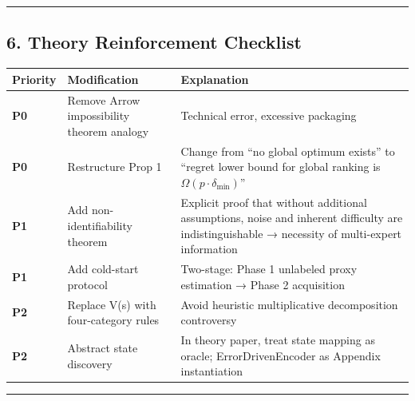 \documentclass[
  12pt,
]{article}
\begin{document}
\begin{center}\rule{0.5\linewidth}{0.5pt}\end{center}

\subsection{6. Theory Reinforcement Checklist}\label{theory-reinforcement-checklist}

\begin{longtable}[]{@{}
  >{\raggedright\arraybackslash}p{}
  >{\raggedright\arraybackslash}p{}
  >{\raggedright\arraybackslash}p{}@{}}
\toprule\noalign{}
\begin{minipage}[b]{\linewidth}\raggedright
Priority
\end{minipage} & \begin{minipage}[b]{\linewidth}\raggedright
Modification
\end{minipage} & \begin{minipage}[b]{\linewidth}\raggedright
Explanation
\end{minipage} \\
\midrule\noalign{}
\endhead
\bottomrule\noalign{}
\endlastfoot
\textbf{P0} & Remove Arrow impossibility theorem analogy & Technical error, excessive packaging \\
\textbf{P0} & Restructure Prop 1 & Change from ``no global optimum exists'' to ``regret lower bound for global ranking is $\Omega(p\cdot\delta_{\min})$'' \\
\textbf{P1} & Add non-identifiability theorem & Explicit proof that without additional assumptions, noise and inherent difficulty are indistinguishable → necessity of multi-expert information \\
\textbf{P1} & Add cold-start protocol & Two-stage: Phase 1 unlabeled proxy estimation → Phase 2 acquisition \\
\textbf{P2} & Replace V(s) with four-category rules & Avoid heuristic multiplicative decomposition controversy \\
\textbf{P2} & Abstract state discovery & In theory paper, treat state mapping as oracle; ErrorDrivenEncoder as Appendix instantiation \\
\end{longtable}

\begin{center}\rule{0.5\linewidth}{0.5pt}\end{center}
\end{document}
